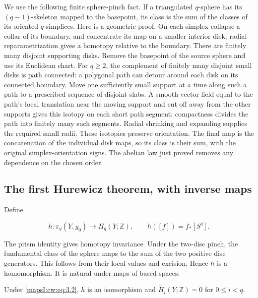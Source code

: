 We use the following finite sphere-pinch fact. If a triangulated \(q\)-sphere has its \((q-1)\)-skeleton mapped to the basepoint, its class is the sum of the classes of its oriented \(q\)-simplices. Here is a geometric proof. On each simplex collapse a collar of its boundary, and concentrate its map on a smaller interior disk; radial reparametrization gives a homotopy relative to the boundary. There are finitely many disjoint supporting disks. Remove the basepoint of the source sphere and use its Euclidean chart. For \(q\geq2\), the complement of finitely many disjoint small disks is path connected: a polygonal path can detour around each disk on its connected boundary. Move one sufficiently small support at a time along such a path to a prescribed sequence of disjoint slabs. A smooth vector field equal to the path's local translation near the moving support and cut off away from the other supports gives this isotopy on each short path segment; compactness divides the path into finitely many such segments. Radial shrinking and expanding supplies the required small radii. These isotopies preserve orientation. The final map is the concatenation of the individual disk maps, so its class is their sum, with the original simplex-orientation signs. The abelian law just proved removes any dependence on the chosen order.

\subsection{The first Hurewicz theorem, with inverse maps}
\label{mapsI:cw:hurewicz-theorem}

Define

\begin{equation}
h:\pi_q(Y,y_0)\longrightarrow H_q(Y;\mathbb Z),\qquad
h([f])=f_*[S^q].
\label{mapsI:cw:eq:4.1}
\end{equation}

The prism identity gives homotopy invariance. Under the two-disc pinch, the fundamental class of the sphere maps to the sum of the two positive disc generators. This follows from their local values and excision. Hence \(h\) is a homomorphism. It is natural under maps of based spaces.

\begin{theorem}
\label{mapsI:cw:hurewicz-theorem-result}
Under \eqref{mapsI:cw:eq:3.2}, \(h\) is an isomorphism and
\(\widetilde H_i(Y;\mathbb Z)=0\) for \(0\leq i<q\).
\end{theorem}

